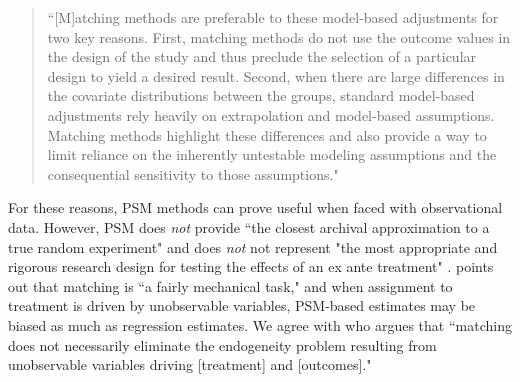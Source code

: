 \documentclass[11pt,reqno,titlepage]{amsart}
\begin{document}
\begin{doublespace}
\begin{quote}
``[M]atching methods are preferable to these model-based adjustments for two key reasons. 
First, matching methods do not use the outcome values in the design of the study and thus preclude the selection of a particular design to yield a desired result.
Second, when there are large differences in the covariate distributions between the groups, standard model-based adjustments rely heavily on extrapolation and model-based assumptions.
Matching methods highlight these differences and also provide a way to limit reliance on the inherently untestable modeling assumptions and the consequential sensitivity to those assumptions."
\end{quote}
For these reasons, PSM methods can prove useful when faced with observational data.
However, PSM does \emph{not} provide ``the closest archival approximation to a true random experiment" and does \emph{not} not represent "the most appropriate and rigorous research design for testing the effects of an ex ante treatment" \citep[p.\,1429]{Kirk:2014gx}.
\citet[pp.\,73-75]{Rosenbaum:2009ul} points out that matching is ``a fairly mechanical  task," and when assignment to treatment is driven by unobservable variables, PSM-based estimates may be biased as much as regression estimates.
We agree with \citet{MinuttiMeza:2014fn} who argues that ``matching does not necessarily eliminate the endogeneity problem resulting from unobservable variables driving [treatment] and [outcomes]."



\end{doublespace}
\end{document}
